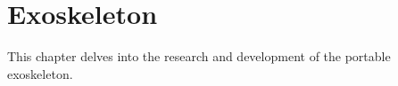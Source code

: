 \chapter{Exoskeleton}

This chapter delves into the research and development of the portable exoskeleton.








